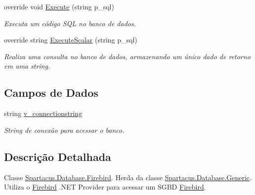 \begin{DoxyCompactItemize}
override void \hyperlink{classSpartacus_1_1Database_1_1Firebird_a1844a94a27db40450a91a1d415a9d456}{Execute} (string p\+\_\+sql)
\begin{DoxyCompactList}\small\item\em Executa um código S\+Q\+L no banco de dados. \end{DoxyCompactList}\item 
override string \hyperlink{classSpartacus_1_1Database_1_1Firebird_ab785abbc3e5f8b989c10c3a771981a83}{Execute\+Scalar} (string p\+\_\+sql)
\begin{DoxyCompactList}\small\item\em Realiza uma consulta no banco de dados, armazenando um único dado de retorno em uma string. \end{DoxyCompactList}\end{DoxyCompactItemize}
\subsection*{Campos de Dados}
\begin{DoxyCompactItemize}
\item 
string \hyperlink{classSpartacus_1_1Database_1_1Firebird_afb3d04d42e84e18c12d75bed71fb0b45}{v\+\_\+connectionstring}
\begin{DoxyCompactList}\small\item\em String de conexão para acessar o banco. \end{DoxyCompactList}\end{DoxyCompactItemize}


\subsection{Descrição Detalhada}
Classe \hyperlink{classSpartacus_1_1Database_1_1Firebird}{Spartacus.\+Database.\+Firebird}. Herda da classe \hyperlink{classSpartacus_1_1Database_1_1Generic}{Spartacus.\+Database.\+Generic}. Utiliza o \hyperlink{classSpartacus_1_1Database_1_1Firebird}{Firebird} .N\+E\+T Provider para acessar um S\+G\+B\+D \hyperlink{classSpartacus_1_1Database_1_1Firebird}{Firebird}. 



